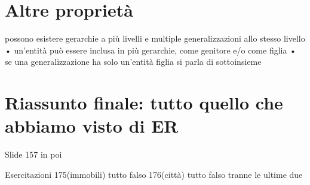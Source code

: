 \section{Altre proprietà}
possono esistere gerarchie a più livelli e multiple
generalizzazioni allo stesso livello
• un'entità può essere inclusa in più gerarchie, come
genitore e/o come figlia
• se una generalizzazione ha solo un’entità figlia si
parla di sottoinsieme

\section{Riassunto finale: tutto quello che abbiamo visto di ER}
Slide 157 in poi


Esercitazioni
175(immobili) tutto falso
176(città) tutto falso tranne le ultime due